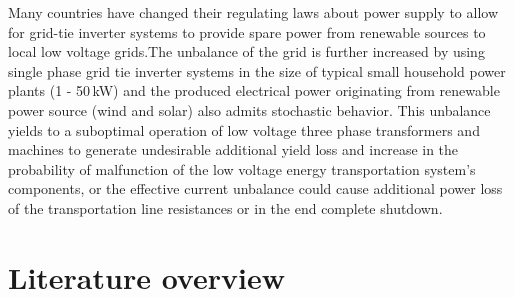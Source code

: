Many countries have changed their regulating laws about power supply to allow for grid-tie inverter systems to provide spare power from renewable sources to local low voltage grids.The unbalance of the grid is further increased by using single phase grid tie inverter systems in the size of typical small household power plants (1 - 50\,kW) and the produced electrical power originating from renewable power source (wind and solar) also admits stochastic behavior. This unbalance yields to a suboptimal operation of low voltage three phase transformers and machines to generate undesirable additional yield loss and increase in the probability of malfunction of the low voltage energy transportation system's components, or the effective current unbalance could cause additional power loss of the transportation line resistances or in the end complete shutdown.

\section{Literature overview}

